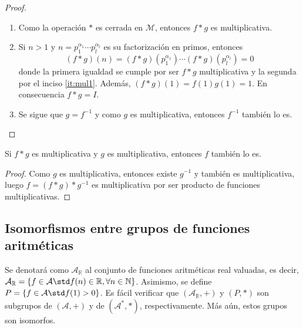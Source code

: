 \begin{proof}
\begin{enumerate}[label=\textnormal{(\arabic*)},ref=\textnormal{\arabic*}]
\item Como la operación $*$ es cerrada en $\mathcal{M}$, entonces $f*g$ es multiplicativa.
\item Si $n>1$ y $n=p_1^{\alpha_1}\cdots p_l^{\alpha_l}$ es su factorización en primos, entonces
	\begin{equation*}
		(f*g)(n) = (f*g)(p_1^{\alpha_1})\cdots (f*g)(p_l^{\alpha_l}) = 0
	\end{equation*}
	donde la primera igualdad se cumple por ser $f*g$ multiplicativa y la segunda por el inciso \eqref{it:mul1}. Además, $(f*g)(1)=f(1)g(1)=1$. En consecuencia $f*g=I$.
\item Se sigue que $g=f^{-1}$ y como $g$ es multiplicativa, entonces $f^{-1}$ también lo es.
\end{enumerate}
\end{proof}

\begin{corollary}
Si $f*g$ es multiplicativa y $g$ es multiplicativa, entonces $f$ también lo es.
\end{corollary}
\begin{proof}
Como $g$ es multiplicativa, entonces existe $g^{-1}$ y también es multiplicativa, luego $f=(f*g)*g^{-1}$ es multiplicativa por ser producto de funciones multiplicativas.
\end{proof}

\subsection{Isomorfismos entre grupos de funciones aritméticas}

Se denotará como $\mathcal{A}_\mathbb{R}$ al conjunto de funciones aritméticas real valuadas, es decir, $\mathcal{A}_{\mathbb{R}}=\{ f \in \mathcal{A} \std f(n) \in \mathbb{R}, \forall n \in \mathbb{N} \}$. Asimismo, se define $P=\{ f \in \mathcal{A} \std f(1)>0 \}$. Es fácil verificar que $(\mathcal{A}_{\mathbb{R}},+)$ y $(P,*)$ son subgrupos de $(\mathcal{A},+)$ y de $(\mathcal{A}^*,*)$, respectivamente. Más aún, estos grupos son isomorfos.

